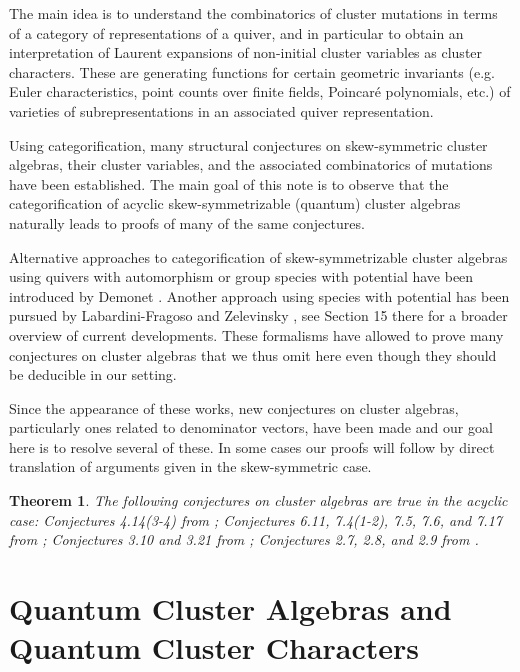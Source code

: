 \documentclass[pdftex]{sigma}
\newtheorem{Theorem}{Theorem}
\begin{document}
  The main idea is to understand the combinatorics of cluster mutations in terms of a category of representations of a quiver, and in particular to obtain an interpretation of Laurent expansions of non-initial cluster variables as cluster characters.
 These are generating functions for certain geometric invariants (e.g. Euler characteristics, point counts over finite fields, Poincar\'e polynomials, etc.) of varieties of subrepresentations in an associated quiver representation.
  
  Using categorification, many structural conjectures on skew-symmetric cluster algebras, their cluster variables, and the associated combinatorics of mutations have been established.
  The main goal of this note is to observe that the categorification of acyclic skew-symmetrizable (quantum) cluster algebras \cite{rupel1,rupel2} naturally leads to proofs of many of the same conjectures.

  Alternative approaches to categorification of skew-symmetrizable cluster algebras using quivers with automorphism or group species with potential have been introduced by Demonet \cite{demonet1,demonet2}. 
  Another approach using species with potential has been pursued by Labardini-Fragoso and Zelevinsky \cite{labardini-zelevinsky}, see Section 15 there for a broader overview of current developments.
  These formalisms have allowed to prove many conjectures on cluster algebras that we thus omit here even though they should be deducible in our setting.

  Since the appearance of these works, new conjectures on cluster algebras, particularly ones related to denominator vectors, have been made and our goal here is to resolve several of these.
  In some cases our proofs will follow by direct translation of arguments given in the skew-symmetric case. 
  \begin{Theorem}
    \label{thm:main}
    The following conjectures on cluster algebras are true in the acyclic case: Conjectures 4.14(3-4) from \cite{FZ03}; Conjectures 6.11, 7.4(1-2), 7.5, 7.6, and 7.17 from \cite{fomin-zelevinsky4}; Conjectures 3.10 and 3.21 from \cite{reading-speyer}; Conjectures 2.7, 2.8, and 2.9 from \cite{reading-stella}.
  \end{Theorem}


\section{Quantum Cluster Algebras and Quantum Cluster Characters}
\label{sec:qca}
  
\end{document}
